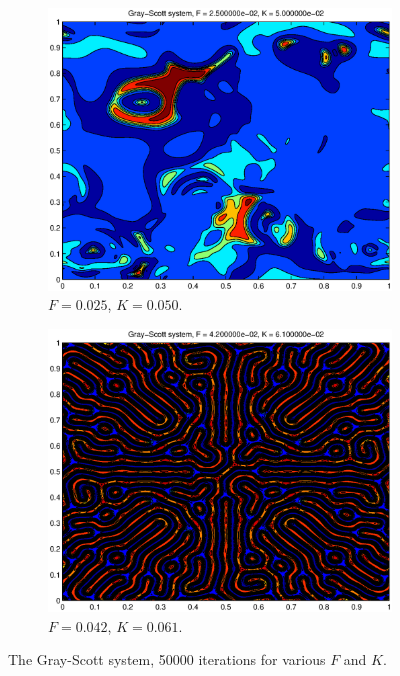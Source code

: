 \documentclass[a4paper,11pt]{article}
\begin{document}
\begin{figure}
\begin{subfigure}[b]{0.48\textwidth}
    \end{subfigure}
      \hfill
    \begin{subfigure}[b]{0.48\textwidth}
        \centering
        \includegraphics[width=\textwidth]{FK2550}
        \caption{$F = 0.025$, $K = 0.050$.}
        \label{fig:FK2550}
    \end{subfigure}
            \hfill
    \begin{subfigure}[b]{0.48\textwidth}
        \centering
        \includegraphics[width=\textwidth]{FK4261}
        \caption{$F = 0.042$, $K = 0.061$.}
        \label{fig:FK4261}
    \end{subfigure}
    \caption{The Gray-Scott system, 50000 iterations for various $F$ and $K$.}
    \label{fig:gray-scott-patterns}
\end{figure}
\end{document}
